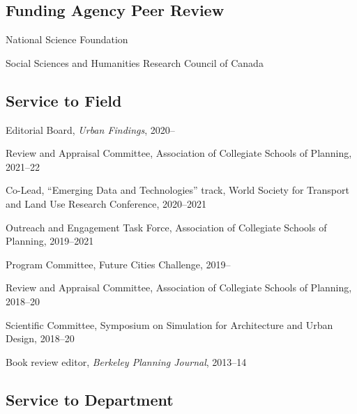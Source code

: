 \documentclass[12pt,letterpaper]{report}
\newcommand{\listitemspace}{0.25em}
\renewenvironment{itemize}
{\begin{list}{}{\setlength{\leftmargin}{0em}
            \setlength{\parskip}{0em}
            \setlength{\itemsep}{\listitemspace}
            \setlength{\parsep}{\listitemspace}}}
{\end{list}}
\begin{document}
    \subsection*{Funding Agency Peer Review}

    \begin{itemize}

        \item National Science Foundation

        \item Social Sciences and Humanities Research Council of Canada

    \end{itemize}

    \subsection*{Service to Field}

    \begin{itemize}

        \item Editorial Board, \textit{Urban Findings}, 2020--

        \item Review and Appraisal Committee, Association of Collegiate Schools of Planning, 2021--22

        \item Co-Lead, \enquote{Emerging Data and Technologies} track, World Society for Transport and Land Use Research Conference, 2020--2021

        \item Outreach and Engagement Task Force, Association of Collegiate Schools of Planning, 2019--2021

        \item Program Committee, Future Cities Challenge, 2019--

        \item Review and Appraisal Committee, Association of Collegiate Schools of Planning, 2018--20

        \item Scientific Committee, Symposium on Simulation for Architecture and Urban Design, 2018--20

        \item Book review editor, \textit{Berkeley Planning Journal}, 2013--14

    \end{itemize}

    \subsection*{Service to Department}
\end{document}
